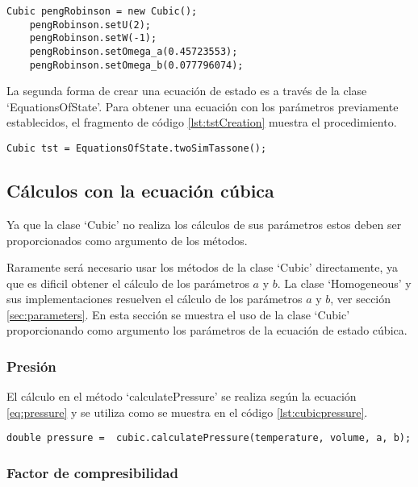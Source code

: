 	\begin{lstlisting}[label={lst:pengRobinsonCreation},caption=Creación de la ecuación de estado de Peng Robinson usando los metodos `Set' de los parametros u y w]
	Cubic pengRobinson = new Cubic();
	pengRobinson.setU(2);
	pengRobinson.setW(-1);
	pengRobinson.setOmega_a(0.45723553);
	pengRobinson.setOmega_b(0.077796074);
	\end{lstlisting}

	La segunda forma de crear una ecuación de estado es a través de la clase `EquationsOfState'. Para obtener una ecuación con los parámetros previamente establecidos, el fragmento de código \ref{lst:tstCreation} muestra el procedimiento.


	\begin{lstlisting}[label=lst:tstCreation,caption=Creación de la ecuación de estado de TST usando la clase `EquationsOfState']
	Cubic tst = EquationsOfState.twoSimTassone();
	\end{lstlisting}

\subsection{Cálculos con la ecuación cúbica}
	Ya que la clase `Cubic' no realiza los cálculos de sus parámetros estos deben ser proporcionados como argumento de los métodos.

	Raramente será necesario usar los métodos de la clase `Cubic' directamente, ya que es dificil obtener el cálculo de los parámetros $a$ y $b$. La clase `Homogeneous' y sus implementaciones resuelven el cálculo de los parámetros $a$ y $b$, ver sección \ref{sec:parameters}. En esta sección se muestra el uso de la clase `Cubic' proporcionando como argumento los parámetros de la ecuación de estado cúbica.

	\subsubsection{Presión}
	El cálculo en el método `calculatePressure' se realiza según la ecuación \ref{eq:pressure} y se utiliza como se muestra en el código \ref{lst:cubicpressure}.
\begin{lstlisting}[label={lst:cubicpressure},caption={Cálculo de presión con una ecuación de estado cúbica, proporcionando como argumento la temperatura, el volumen y los parámetros $a$ y $b$}]
	 double pressure =  cubic.calculatePressure(temperature, volume, a, b);
\end{lstlisting}
	\subsubsection{Factor de compresibilidad}

